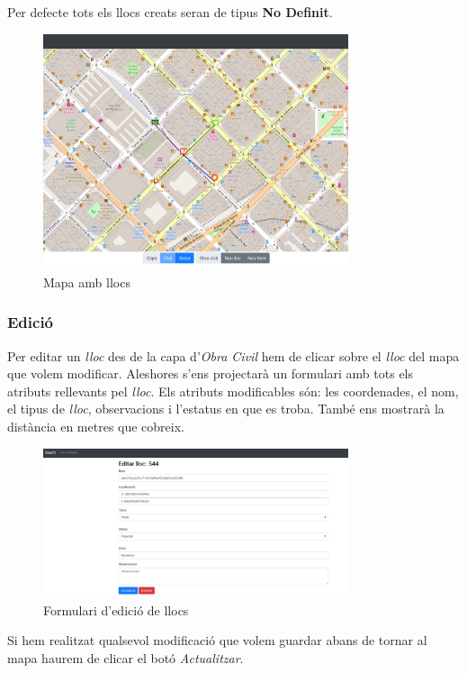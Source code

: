 \documentclass[a4paper]{article}
\begin{document}
	Per defecte tots els llocs creats seran de tipus \textbf{No Definit}.
	
	\begin{figure}[H]
		\centering
		\includegraphics[width=0.8\textwidth]{images/sites_map.png}
		\caption{Mapa amb llocs}
	\end{figure}

	\subsubsection{Edició}
	Per editar un \emph{lloc} des de la capa d'\emph{Obra Civil} hem de clicar sobre el \emph{lloc} del mapa que volem modificar. Aleshores s'ens projectarà un formulari amb tots els atributs rellevants pel \emph{lloc}. Els atributs modificables són: les coordenades, el nom, el tipus de \emph{lloc}, observacions i l'estatus en que es troba. També ens mostrarà la distància en metres que cobreix.
	
	\begin{figure}[H]
		\centering
		\includegraphics[width=0.8\textwidth]{images/sites_edit.png}
		\caption{Formulari d'edició de llocs}
	\end{figure}

	Si hem realitzat qualsevol modificació que volem guardar abans de tornar al mapa haurem de clicar el botó \emph{Actualitzar}.
	
\end{document}
